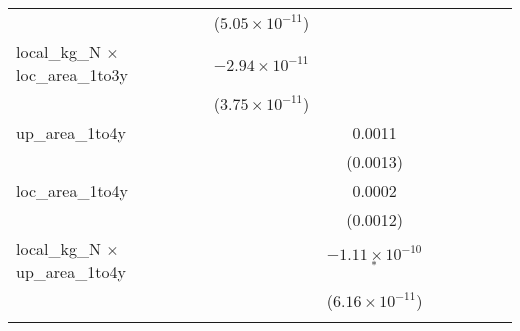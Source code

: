 \begin{tabular}{lcccccccc}
                                               &                               & ($5.05\times 10^{-11}$)       &                               &                               &                               &                               &                               &   \\   
   local\_kg\_N $\times$ loc\_area\_1to3y      &                               & $-2.94\times 10^{-11}$        &                               &                               &                               &                               &                               &   \\   
                                               &                               & ($3.75\times 10^{-11}$)       &                               &                               &                               &                               &                               &   \\   
   up\_area\_1to4y                             &                               &                               & 0.0011                        &                               &                               &                               &                               &   \\   
                                               &                               &                               & (0.0013)                      &                               &                               &                               &                               &   \\   
   loc\_area\_1to4y                            &                               &                               & 0.0002                        &                               &                               &                               &                               &   \\   
                                               &                               &                               & (0.0012)                      &                               &                               &                               &                               &   \\   
   local\_kg\_N $\times$ up\_area\_1to4y       &                               &                               & $-1.11\times 10^{-10}$$^{*}$  &                               &                               &                               &                               &   \\   
                                               &                               &                               & ($6.16\times 10^{-11}$)       &                               &                               &                               &                               &   \\   
$$
\end{tabular}
